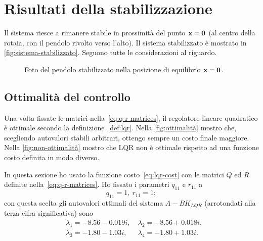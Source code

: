 \section{Risultati della stabilizzazione}
Il sistema riesce a rimanere stabile in prossimità del punto $\mathbf{x} = \mathbf{0}$
(al centro della rotaia, con il pendolo rivolto verso l'alto).
Il sistema stabilizzato è mostrato in \autoref{fig:sistema-stabilizzato}.
Seguono tutte le considerazioni al riguardo.


\begin{figure}[H]
    \centering
    \caption[Pendolo stabilizzato]{Foto del pendolo stabilizzato nella
    posizione di equilibrio $\mathbf{x} = \mathbf{0}$.}
    \label{fig:sistema-stabilizzato}
\end{figure}


\subsection{Ottimalità del controllo}
Una volta fissate le matrici nella~\eqref{eq:q-r-matrices},
il regolatore lineare quadratico è ottimale secondo la
definizione~\ref{def:lqr}.
Nella \autoref{fig:ottimalità} mostro che, scegliendo autovalori
stabili arbitrari, ottengo sempre un costo finale maggiore.
Nella \autoref{fig:non-ottimalità} mostro che LQR non è
ottimale rispetto ad una funzione costo definita in modo diverso.

In questa sezione ho usato la funzione costo~\eqref{eq:lqr-cost} con le matrici
$Q$ ed $R$ definite nella~\eqref{eq:q-r-matrices}. 
Ho fissato i parametri $q_{11}$ e $r_{11}$ a
\begin{equation*}
    q_{11} = 1,\  r_{11} = 1;
\end{equation*}
con questa scelta gli autovalori ottimali del sistema $A - BK_{LQR}$ (arrotondati alla terza cifra significativa) sono
\begin{equation}
    \left.
        \begin{aligned}
        &\lambda_1 = -8.56 - 0.019i, \
        &\lambda_2 = -8.56 + 0.018i, \\
        &\lambda_3 = -1.80 - 1.03i, \
        &\lambda_4 = -1.80 + 1.03i.
        \end{aligned}
    \right.
    \label{eq:lqr-eigenvalues}
\end{equation}

